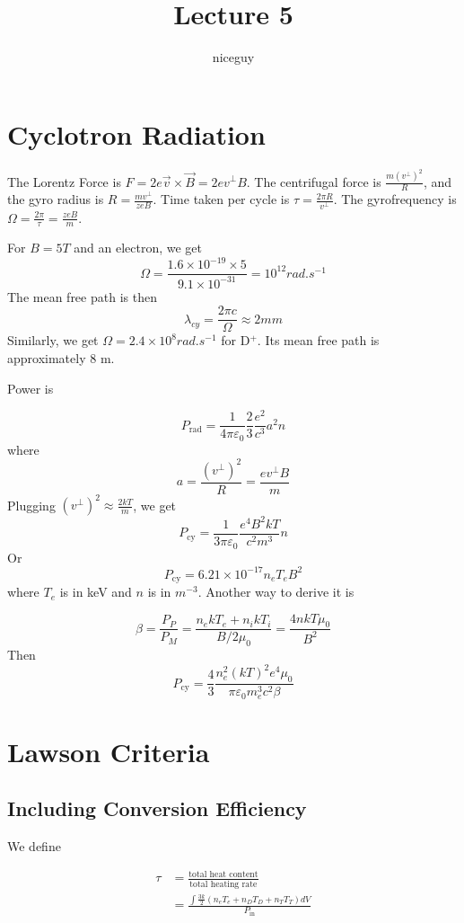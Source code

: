 \documentclass[12pt]{article}
\title{Lecture 5}
\author{niceguy}
\begin{document}
\maketitle

\section{Cyclotron Radiation}

The Lorentz Force is $F = 2e\vec v \times \vec B = 2ev^\perp B$. The centrifugal force is $\frac{m\left(v^\perp\right)^2}{R}$, and the gyro radius is $R = \frac{mv^\perp}{zeB}$. Time taken per cycle is $\tau = \frac{2\pi R}{v^\perp}$. The gyrofrequency is $\Omega = \frac{2\pi}{\tau} = \frac{zeB}{m}$.

\begin{ex}
    For $B = 5\unit{T}$ and an electron, we get
    $$\Omega = \frac{1.6\times10^{-19} \times 5}{9.1\times10^{-31}} = 10^{12} \unit{rad.s^{-1}}$$
    The mean free path is then
    $$\lambda_{cy} = \frac{2\pi c}{\Omega} \approx 2\unit{mm}$$
    Similarly, we get $\Omega = 2.4 \times 10^8 \unit{rad.s^{-1}}$ for D$^+$.
    Its mean free path is approximately 8 m.
\end{ex}

Power is

$$P_{\text{rad}} = \frac{1}{4\pi\varepsilon_0} \frac{2}{3} \frac{e^2}{c^3} a^2n$$
where
$$a = \frac{\left(v^\perp\right)^2}{R} = \frac{ev^\perp B}{m}$$
Plugging $\left(v^\perp\right)^2 \approx \frac{2kT}{m}$, we get
$$P_{\text{cy}} = \frac{1}{3\pi\varepsilon_0} \frac{e^4B^2kT}{c^2m^3} n$$
Or
$$P_{\text{cy}} = 6.21 \times 10^{-17} n_eT_eB^2$$
where $T_e$ is in keV and $n$ is in $\unit{m^{-3}}$. Another way to derive it is

$$\beta = \frac{P_P}{P_M} = \frac{n_ekT_e + n_ikT_i}{B/2\mu_0} = \frac{4nkT\mu_0}{B^2}$$
Then
$$P_{\text{cy}} = \frac{4}{3} \frac{n_e^2(kT)^2e^4\mu_0}{\pi\varepsilon_0m_e^3c^2\beta}$$

\section{Lawson Criteria}

\subsection{Including Conversion Efficiency}

We define

\begin{align*}
    \tau &= \frac{\text{total heat content}}{\text{total heating rate}} \\
         &= \frac{\int \frac{3k}{2}\left(n_eT_e + n_DT_D + n_TT_T\right)dV}{P_{\text{in}}}
\end{align*}
\end{document}
